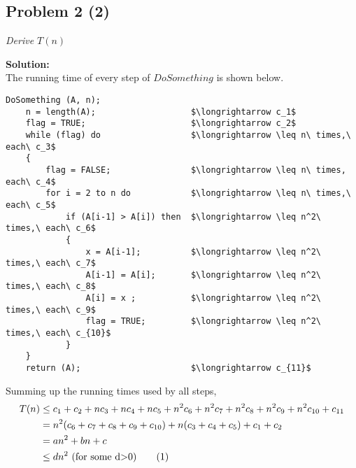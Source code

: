 \documentclass[12pt,a4paper]{article}
\newcommand\numberthis{\addtocounter{equation}{1}\tag{\theequation}}
\newcommand{\solution}{\noindent\textbf{Solution:}\\}
\begin{document}

\newpage
\subsection*{Problem 2 (2)}
\textit{
    Derive $T(n)$
}

\solution
The running time of every step of $DoSomething$ is shown below.

\begin{lstlisting}[title=Running time used by every step of $DoSomething$, mathescape=true]
DoSomething (A, n);
    n = length(A);                   $\longrightarrow c_1$
    flag = TRUE;                     $\longrightarrow c_2$
    while (flag) do                  $\longrightarrow \leq n\ times,\ each\ c_3$
    {
        flag = FALSE;                $\longrightarrow \leq n\ times, each\ c_4$
        for i = 2 to n do            $\longrightarrow \leq n\ times,\ each\ c_5$
            if (A[i-1] > A[i]) then  $\longrightarrow \leq n^2\ times,\ each\ c_6$
            {
                x = A[i-1];          $\longrightarrow \leq n^2\ times,\ each\ c_7$
                A[i-1] = A[i];       $\longrightarrow \leq n^2\ times,\ each\ c_8$
                A[i] = x ;           $\longrightarrow \leq n^2\ times,\ each\ c_9$
                flag = TRUE;         $\longrightarrow \leq n^2\ times,\ each\ c_{10}$
            }
    }
    return (A);                      $\longrightarrow c_{11}$
\end{lstlisting}
Summing up the running times used by all steps,
\begin{align*}
    T(n) &\leq c_1 + c_2 + nc_3 + nc_4 + nc_5 + n^2c_6 + n^2c_7 + n^2c_8 + n^2c_9 + n^2c_{10} + c_{11} \\
         &= n^2(c_6 + c_7 + c_8 + c_9 + c_{10}) + n(c_3 + c_4 + c_5) + c_1 + c_2 \\
         &= an^2 + bn + c \\
         &\leq dn^2 \text{ (for some d>0)} \numberthis \label{eq:q_2} 
\end{align*}
\end{document}
